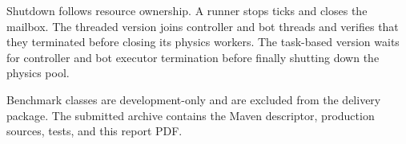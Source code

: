 Shutdown follows resource ownership. A runner stops ticks and closes the
mailbox. The threaded version joins controller and bot threads and verifies
that they terminated before closing its physics workers. The task-based version
waits for controller and bot executor termination before finally shutting down
the physics pool.

Benchmark classes are development-only and are excluded from the delivery
package. The submitted archive contains the Maven descriptor, production
sources, tests, and this report PDF.

